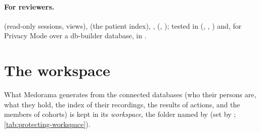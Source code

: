 \paragraph{For reviewers.}  (read-only sessions, views),  (the
patient index), ,  (, ); tested in
 (,
,
) and, for Privacy Mode over a db-builder database, in
.

\section{The workspace}
\label{sec:protecting-workspace}

What Medorama generates from the connected databases (who their persons are, what they hold, the
index of their recordings, the results of actions, and the members of cohorts) is kept in its
\emph{workspace}, the folder named by  (set by ; \cref{tab:protecting-workspace}).

